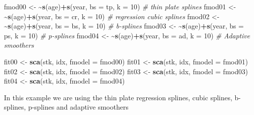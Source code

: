 \documentclass[
]{book}
\newenvironment{Shaded}{\begin{snugshade}}{\end{snugshade}}
\newcommand{\AttributeTok}[1]{\textcolor[rgb]{0.13,0.29,0.53}{#1}}
\newcommand{\CommentTok}[1]{\textcolor[rgb]{0.56,0.35,0.01}{\textit{#1}}}
\newcommand{\DecValTok}[1]{\textcolor[rgb]{0.00,0.00,0.81}{#1}}
\newcommand{\ErrorTok}[1]{\textcolor[rgb]{0.64,0.00,0.00}{\textbf{#1}}}
\newcommand{\FunctionTok}[1]{\textcolor[rgb]{0.13,0.29,0.53}{\textbf{#1}}}
\newcommand{\NormalTok}[1]{#1}
\newcommand{\OtherTok}[1]{\textcolor[rgb]{0.56,0.35,0.01}{#1}}
\newcommand{\SpecialCharTok}[1]{\textcolor[rgb]{0.81,0.36,0.00}{\textbf{#1}}}
\newcommand{\StringTok}[1]{\textcolor[rgb]{0.31,0.60,0.02}{#1}}
\begin{document}
\begin{Shaded}
\begin{Highlighting}[]
\NormalTok{fmod00 }\OtherTok{\textless{}{-}} \ErrorTok{\textasciitilde{}}\FunctionTok{s}\NormalTok{(age)}\SpecialCharTok{+}\FunctionTok{s}\NormalTok{(year, }\AttributeTok{bs =} \StringTok{\textquotesingle{}tp\textquotesingle{}}\NormalTok{, }\AttributeTok{k =} \DecValTok{10}\NormalTok{) }\CommentTok{\# thin plate splines}
\NormalTok{fmod01 }\OtherTok{\textless{}{-}} \ErrorTok{\textasciitilde{}}\FunctionTok{s}\NormalTok{(age)}\SpecialCharTok{+}\FunctionTok{s}\NormalTok{(year, }\AttributeTok{bs =} \StringTok{\textquotesingle{}cr\textquotesingle{}}\NormalTok{, }\AttributeTok{k =} \DecValTok{10}\NormalTok{) }\CommentTok{\# regression cubic splines}
\NormalTok{fmod02 }\OtherTok{\textless{}{-}} \ErrorTok{\textasciitilde{}}\FunctionTok{s}\NormalTok{(age)}\SpecialCharTok{+}\FunctionTok{s}\NormalTok{(year, }\AttributeTok{bs =} \StringTok{\textquotesingle{}bs\textquotesingle{}}\NormalTok{, }\AttributeTok{k =} \DecValTok{10}\NormalTok{) }\CommentTok{\# b{-}splines}
\NormalTok{fmod03 }\OtherTok{\textless{}{-}} \ErrorTok{\textasciitilde{}}\FunctionTok{s}\NormalTok{(age)}\SpecialCharTok{+}\FunctionTok{s}\NormalTok{(year, }\AttributeTok{bs =} \StringTok{\textquotesingle{}ps\textquotesingle{}}\NormalTok{, }\AttributeTok{k =} \DecValTok{10}\NormalTok{) }\CommentTok{\# p{-}splines}
\NormalTok{fmod04 }\OtherTok{\textless{}{-}} \ErrorTok{\textasciitilde{}}\FunctionTok{s}\NormalTok{(age)}\SpecialCharTok{+}\FunctionTok{s}\NormalTok{(year, }\AttributeTok{bs =} \StringTok{\textquotesingle{}ad\textquotesingle{}}\NormalTok{, }\AttributeTok{k =} \DecValTok{10}\NormalTok{) }\CommentTok{\# Adaptive smoothers}

\NormalTok{fit00 }\OtherTok{\textless{}{-}} \FunctionTok{sca}\NormalTok{(stk, idx, }\AttributeTok{fmodel =}\NormalTok{ fmod00)}
\NormalTok{fit01 }\OtherTok{\textless{}{-}} \FunctionTok{sca}\NormalTok{(stk, idx, }\AttributeTok{fmodel =}\NormalTok{ fmod01)}
\NormalTok{fit02 }\OtherTok{\textless{}{-}} \FunctionTok{sca}\NormalTok{(stk, idx, }\AttributeTok{fmodel =}\NormalTok{ fmod02)}
\NormalTok{fit03 }\OtherTok{\textless{}{-}} \FunctionTok{sca}\NormalTok{(stk, idx, }\AttributeTok{fmodel =}\NormalTok{ fmod03)}
\NormalTok{fit04 }\OtherTok{\textless{}{-}} \FunctionTok{sca}\NormalTok{(stk, idx, }\AttributeTok{fmodel =}\NormalTok{ fmod04)}
\end{Highlighting}
\end{Shaded}

In this example we are using the thin plate regression splines, cubic splines, b-splines, p-splines and adaptive smoothers
\end{document}
